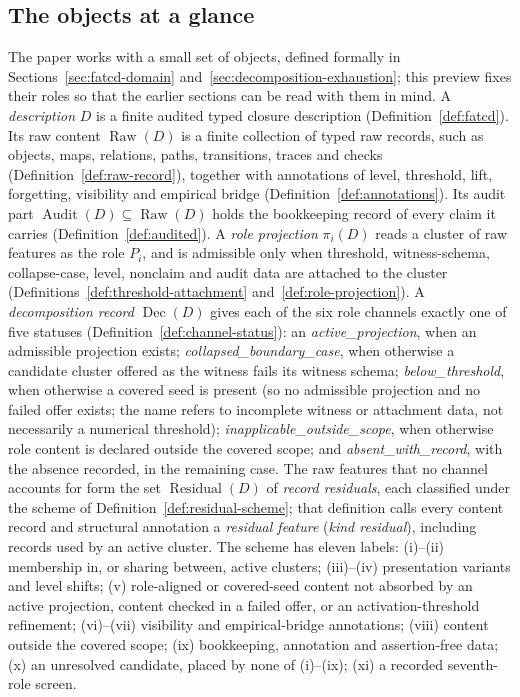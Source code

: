 \documentclass[11pt]{article}
\theoremstyle{definition}
\newcommand{\Raw}[1]{\ensuremath{\operatorname{Raw}\!\left(#1\right)}}
\newcommand{\Audit}[1]{\ensuremath{\operatorname{Audit}\!\left(#1\right)}}
\newcommand{\Dec}[1]{\ensuremath{\operatorname{Dec}\!\left(#1\right)}}
\newcommand{\Residual}[1]{\ensuremath{\operatorname{Residual}\!\left(#1\right)}}
\newcommand{\activeproj}{\textit{active\_\allowbreak projection}}
\newcommand{\belowthr}{\textit{below\_\allowbreak threshold}}
\newcommand{\collapsedbc}{\textit{collapsed\_\allowbreak boundary\_\allowbreak case}}
\newcommand{\absentrec}{\textit{absent\_\allowbreak with\_\allowbreak record}}
\newcommand{\outsidescope}{\textit{inapplicable\_\allowbreak outside\_\allowbreak scope}}
\begin{document}
\subsection{The objects at a glance}\label{subsec:objects-at-a-glance}

The paper works with a small set of objects, defined formally in
Sections~\ref{sec:fatcd-domain} and~\ref{sec:decomposition-exhaustion};
this preview fixes their roles so that the earlier sections can be read with
them in mind. A \emph{description} \(D\) is a finite audited typed closure
description (Definition~\ref{def:fatcd}). Its raw content \(\Raw{D}\) is a
finite collection of typed raw records, such as objects, maps, relations,
paths, transitions, traces and checks (Definition~\ref{def:raw-record}),
together with annotations of level, threshold, lift, forgetting, visibility
and empirical bridge (Definition~\ref{def:annotations}). Its audit part
\(\Audit{D}\subseteq\Raw{D}\) holds the bookkeeping record of every claim it
carries (Definition~\ref{def:audited}). A \emph{role projection} \(\pi_i(D)\)
reads a cluster of raw features as the role \(P_i\), and is admissible only
when threshold, witness-schema, collapse-case, level, nonclaim and audit
data are attached to the cluster
(Definitions~\ref{def:threshold-attachment} and~\ref{def:role-projection}). A
\emph{decomposition record} \(\Dec{D}\) gives each of the six role channels
exactly one of five statuses (Definition~\ref{def:channel-status}): an
\activeproj{}, when an admissible projection exists; \collapsedbc{}, when
otherwise a candidate cluster offered as the witness fails its witness
schema; \belowthr{}, when otherwise a covered seed is present (so no
admissible projection and no failed offer exists; the name refers to incomplete
witness or attachment data, not necessarily a numerical threshold); \outsidescope{}, when otherwise
role content is declared outside the covered scope; and \absentrec{}, with the
absence recorded, in the remaining case. The
raw features that no channel accounts for form the set \(\Residual{D}\) of
\emph{record residuals}, each classified under the scheme of
Definition~\ref{def:residual-scheme}; that definition calls every content
record and structural annotation a \emph{residual feature} (\emph{kind
residual}), including records used by an active cluster. The
scheme has eleven labels: (i)--(ii) membership in, or sharing between, active
clusters; (iii)--(iv) presentation variants and level shifts; (v) role-aligned or covered-seed
content not absorbed by an active projection, content checked in a failed offer, or an activation-threshold refinement; (vi)--(vii) visibility and
empirical-bridge annotations; (viii) content outside the covered scope; (ix)
bookkeeping, annotation and assertion-free data; (x) an unresolved candidate,
placed by none of (i)--(ix); (xi) a recorded seventh-role screen.
\end{document}
